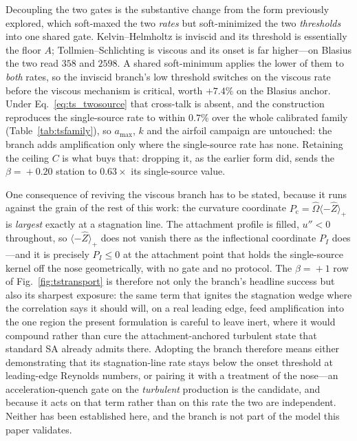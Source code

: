 Decoupling the two gates is the substantive change from the form
previously explored, which soft-maxed the two \emph{rates} but soft-minimized
the two \emph{thresholds} into one shared gate. Kelvin--Helmholtz is
inviscid and its threshold is essentially the floor $A$; Tollmien--Schlichting
is viscous and its onset is far higher---on Blasius the two read $358$ and
$2598$. A shared soft-minimum applies the lower of them to \emph{both}
rates, so the inviscid branch's low threshold switches on the viscous rate
before the viscous mechanism is critical, worth $+7.4\%$ on the Blasius
anchor. Under Eq.~\eqref{eq:ts_twosource} that cross-talk is absent, and the
construction reproduces the single-source rate to within $0.7\%$ over the
whole calibrated family (Table~\ref{tab:tsfamily}), so $a_{\max}$, $k$ and
the airfoil campaign are untouched: the branch adds amplification only where
the single-source rate has none. Retaining the ceiling $C$ is what buys
that: dropping it, as the earlier form did, sends the $\beta\!=\!+0.20$
station to $0.63\times$ its single-source value.

One consequence of reviving the viscous branch has to be stated, because it
runs against the grain of the rest of this work: the curvature coordinate
$P_{\mathrm c}=\hat\Omega\langle-\hat Z\rangle_+$ is \emph{largest} exactly at
a stagnation line. The attachment profile is filled, $u''\!<\!0$ throughout, so
$\langle-\hat Z\rangle_+$ does not vanish there as the inflectional coordinate
$P_I$ does---and it is precisely $P_I\!\le\!0$ at the attachment point that
holds the single-source kernel off the nose geometrically, with no gate and no
protocol. The $\beta\!=\!+1$ row of Fig.~\ref{fig:tstransport} is therefore not
only the branch's headline success but also its sharpest exposure: the same
term that ignites the stagnation wedge where the correlation says it should
will, on a real leading edge, feed amplification into the one region the
present formulation is careful to leave inert, where it would compound rather
than cure the attachment-anchored turbulent state that standard SA already
admits there. Adopting the branch therefore means either demonstrating that its
stagnation-line rate stays below the onset threshold at leading-edge Reynolds
numbers, or pairing it with a treatment of the nose---an acceleration-quench
gate on the \emph{turbulent} production is the candidate, and because it acts on
that term rather than on this rate the two are independent. Neither has been
established here, and the branch is not part of the model this paper validates.

